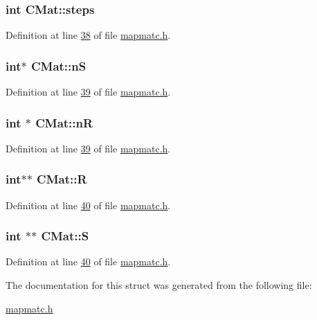 \hypertarget{structCMat_ac7f11b4def56fa42a60aa255d1986741}{
\subsubsection[{steps}]{\setlength{\rightskip}{0pt plus 5cm}int C\-Mat\-::steps}}\label{structCMat_ac7f11b4def56fa42a60aa255d1986741}


Definition at line \hyperlink{mapmatc_8h_source_l00038}{38} of file \hyperlink{mapmatc_8h_source}{mapmatc.\-h}.

\hypertarget{structCMat_a788a427e12e648fc255569a6255a1201}{
\subsubsection[{n\-S}]{\setlength{\rightskip}{0pt plus 5cm}int$\ast$ C\-Mat\-::n\-S}}\label{structCMat_a788a427e12e648fc255569a6255a1201}


Definition at line \hyperlink{mapmatc_8h_source_l00039}{39} of file \hyperlink{mapmatc_8h_source}{mapmatc.\-h}.

\hypertarget{structCMat_a82bfd1296c5a77b759046de488437601}{
\subsubsection[{n\-R}]{\setlength{\rightskip}{0pt plus 5cm}int $\ast$ C\-Mat\-::n\-R}}\label{structCMat_a82bfd1296c5a77b759046de488437601}


Definition at line \hyperlink{mapmatc_8h_source_l00039}{39} of file \hyperlink{mapmatc_8h_source}{mapmatc.\-h}.

\hypertarget{structCMat_a96d82ea984608c87edb52bf17f63a827}{
\subsubsection[{R}]{\setlength{\rightskip}{0pt plus 5cm}int$\ast$$\ast$ C\-Mat\-::\-R}}\label{structCMat_a96d82ea984608c87edb52bf17f63a827}


Definition at line \hyperlink{mapmatc_8h_source_l00040}{40} of file \hyperlink{mapmatc_8h_source}{mapmatc.\-h}.

\hypertarget{structCMat_a29acbc37cb0a4864ce6958808059766d}{
\subsubsection[{S}]{\setlength{\rightskip}{0pt plus 5cm}int $\ast$$\ast$ C\-Mat\-::\-S}}\label{structCMat_a29acbc37cb0a4864ce6958808059766d}


Definition at line \hyperlink{mapmatc_8h_source_l00040}{40} of file \hyperlink{mapmatc_8h_source}{mapmatc.\-h}.



The documentation for this struct was generated from the following file\-:\begin{DoxyCompactItemize}
\item 
\hyperlink{mapmatc_8h}{mapmatc.\-h}\end{DoxyCompactItemize}
